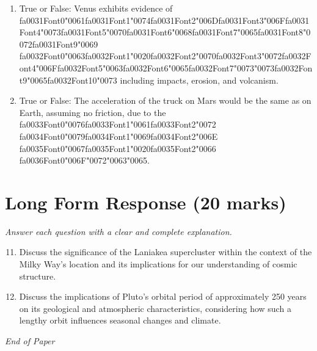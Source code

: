 \documentclass[12pt]{article}
\begin{document}
\begin{enumerate}[label=\arabic*.]
\item True or False: Venus exhibits evidence of {\csname fa0031Font0\endcsname\char"0061}{\csname fa0031Font1\endcsname\char"0074}{\csname fa0031Font2\endcsname\char"006D}{\csname fa0031Font3\endcsname\char"006F}{\csname fa0031Font4\endcsname\char"0073}{\csname fa0031Font5\endcsname\char"0070}{\csname fa0031Font6\endcsname\char"0068}{\csname fa0031Font7\endcsname\char"0065}{\csname fa0031Font8\endcsname\char"0072}{\csname fa0031Font9\endcsname\char"0069} {\csname fa0032Font0\endcsname\char"0063}{\csname fa0032Font1\endcsname\char"0020}{\csname fa0032Font2\endcsname\char"0070}{\csname fa0032Font3\endcsname\char"0072}{\csname fa0032Font4\endcsname\char"006F}{\csname fa0032Font5\endcsname\char"0063}{\csname fa0032Font6\endcsname\char"0065}{\csname fa0032Font7\endcsname\char"0073}{\char"0073}{\csname fa0032Font9\endcsname\char"0065}{\csname fa0032Font10\endcsname\char"0073} including impacts, erosion, and volcanism.
\item True or False: The acceleration of the truck on Mars would be the same as on Earth, assuming no friction, due to the {\csname fa0033Font0\endcsname\char"0076}{\csname fa0033Font1\endcsname\char"0061}{\csname fa0033Font2\endcsname\char"0072} {\csname fa0034Font0\endcsname\char"0079}{\csname fa0034Font1\endcsname\char"0069}{\csname fa0034Font2\endcsname\char"006E} {\csname fa0035Font0\endcsname\char"0067}{\csname fa0035Font1\endcsname\char"0020}{\csname fa0035Font2\endcsname\char"0066} {\csname fa0036Font0\endcsname\char"006F}{\char"0072}{\char"0063}{\char"0065}.
\end{enumerate}

\section*{Long Form Response (20 marks)}
\textit{Answer each question with a clear and complete explanation.}
\begin{enumerate}[label=\arabic*.]
\setcounter{enumi}{10}
\item Discuss the significance of the Laniakea supercluster within the context of the Milky
Way's location and its implications for our understanding of cosmic structure.
\item Discuss the implications of Pluto's orbital period of approximately 250 years on its
geological and atmospheric characteristics, considering how such a lengthy orbit
influences seasonal changes and climate.
\end{enumerate}

\vfill
\noindent\textit{End of Paper}
\end{document}
